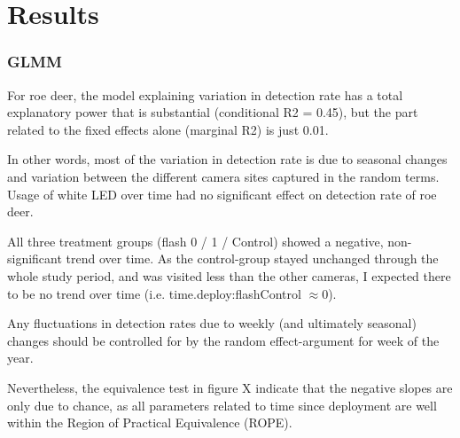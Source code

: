 \chapter{Results}
%
%
%



\subsection{GLMM}

For roe deer, the model explaining variation in detection rate has a total explanatory power that is substantial (conditional R2 = 0.45), but the part related to the fixed effects alone (marginal R2) is just 0.01.

In other words, most of the variation in detection rate is due to seasonal changes and variation between the different camera sites captured in the random terms.
Usage of white LED over time had no significant effect on detection rate of roe deer.

All three treatment groups (flash 0 / 1 / Control) showed a negative, non-significant trend over time.
As the control-group stayed unchanged through the whole study period, and was visited less than the other cameras, I expected there to be no trend over time (i.e. time.deploy:flashControl $\approx 0$).

Any fluctuations in detection rates due to weekly (and ultimately seasonal) changes should be controlled for by the random effect-argument for week of the year.

Nevertheless, the equivalence test in figure X %
indicate that the negative slopes are only due to chance, as all parameters related to time since deployment are well within the Region of Practical Equivalence (ROPE).



